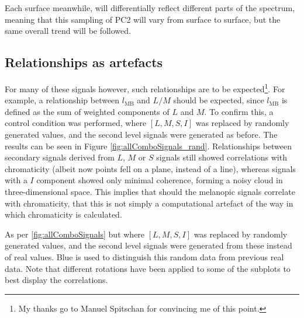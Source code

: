 
Each surface meanwhile, will differentially reflect different parts of the spectrum, meaning that this sampling of \gls{PC2} will vary from surface to surface, but the same overall trend will be followed.


\subsection{Relationships as artefacts}

For many of these signals however, such relationships are to be expected\footnote{My thanks go to Manuel Spitschan for convincing me of this point.}. For example, a relationship between $l_{\text{MB}}$ and $L/M$ should be expected, since $l_{\text{MB}}$ is defined as the sum of weighted components of $L$ and $M$. To confirm this, a control condition was performed, where $[L,M,S,I]$ was replaced by randomly generated values, and the second level signals were generated as before. The results can be seen in Figure \ref{fig:allComboSignals_rand}. Relationships between secondary signals derived from $L$, $M$ or $S$ signals still showed correlations with chromaticity (albeit now points fell on a plane, instead of a line), whereas signals with a $I$ component showed only minimal coherence, forming a noisy cloud in three-dimensional space. This implies that should the melanopic signals correlate with chromaticity, that this is not simply a computational artefact of the way in which chromaticity is calculated.

\begin{fullpagefigure}
\caption{As per \ref{fig:allComboSignals} but where $[L,M,S,I]$ was replaced by randomly generated values, and the second level signals were generated from these instead of real values. Blue is used to distinguish this random data from previous real data. Note that different rotations have been applied to some of the subplots to best display the correlations.}
\label{fig:allComboSignals_rand}
\end{fullpagefigure}

